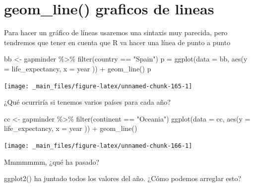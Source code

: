 \documentclass[
]{book}
\newenvironment{Shaded}{\begin{snugshade}}{\end{snugshade}}
\newcommand{\AttributeTok}[1]{\textcolor[rgb]{0.77,0.63,0.00}{#1}}
\newcommand{\FunctionTok}[1]{\textcolor[rgb]{0.00,0.00,0.00}{#1}}
\newcommand{\NormalTok}[1]{#1}
\newcommand{\OtherTok}[1]{\textcolor[rgb]{0.56,0.35,0.01}{#1}}
\newcommand{\SpecialCharTok}[1]{\textcolor[rgb]{0.00,0.00,0.00}{#1}}
\newcommand{\StringTok}[1]{\textcolor[rgb]{0.31,0.60,0.02}{#1}}
\begin{document}
\hypertarget{geom_line-graficos-de-lineas}{%
\section{geom\_line() graficos de lineas}\label{geom_line-graficos-de-lineas}}

Para hacer un gráfico de líneas usaremos una sintaxis muy parecida, pero tendremos que tener en cuenta que R va hacer una línea de punto a punto

\begin{Shaded}
\begin{Highlighting}[]
\NormalTok{bb }\OtherTok{\textless{}{-}}\NormalTok{ gapminder }\SpecialCharTok{\%\textgreater{}\%} \FunctionTok{filter}\NormalTok{(country }\SpecialCharTok{==} \StringTok{"Spain"}\NormalTok{)}
\NormalTok{p }\OtherTok{=} \FunctionTok{ggplot}\NormalTok{(}\AttributeTok{data =}\NormalTok{ bb, }\FunctionTok{aes}\NormalTok{(}\AttributeTok{y =}\NormalTok{ life\_expectancy, }\AttributeTok{x =}\NormalTok{ year )) }\SpecialCharTok{+}
  \FunctionTok{geom\_line}\NormalTok{()}
\NormalTok{p}
\end{Highlighting}
\end{Shaded}

\begin{center}\texttt{[image: \_main\_files/figure-latex/unnamed-chunk-165-1]} \end{center}

¿Qué ocurriría si tenemos varios países para cada año?

\begin{Shaded}
\begin{Highlighting}[]
\NormalTok{cc }\OtherTok{\textless{}{-}}\NormalTok{ gapminder }\SpecialCharTok{\%\textgreater{}\%} \FunctionTok{filter}\NormalTok{(continent }\SpecialCharTok{==} \StringTok{"Oceania"}\NormalTok{)}
\FunctionTok{ggplot}\NormalTok{(}\AttributeTok{data =}\NormalTok{ cc, }\FunctionTok{aes}\NormalTok{(}\AttributeTok{y =}\NormalTok{ life\_expectancy, }\AttributeTok{x =}\NormalTok{ year )) }\SpecialCharTok{+}
  \FunctionTok{geom\_line}\NormalTok{()}
\end{Highlighting}
\end{Shaded}

\begin{center}\texttt{[image: \_main\_files/figure-latex/unnamed-chunk-166-1]} \end{center}

Mmmmmmm, ¿qué ha pasado?

ggplot2() ha juntado todos los valores del año. ¿Cómo podemos arreglar esto?
\end{document}
